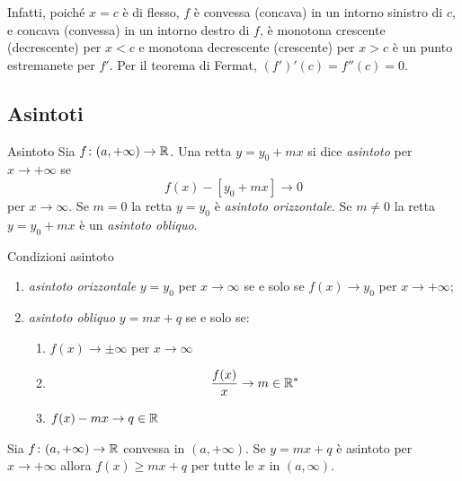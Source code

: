 \documentclass[a4paper]{article}
\begin{document}
Infatti, poiché \(x=c\) è di flesso, \(f\) è convessa (concava) in un intorno sinistro di \(c\),
e concava (convessa) in un intorno destro di \(f\), è monotona crescente (decrescente)
per \(x<c\) e monotona decrescente (crescente) per \(x>c\) è un punto estremanete per \(f'\).
Per il teorema di Fermat, \((f')'(c) = f''(c) = 0\).

\subsection{Asintoti}

\begin{radioactive}
\begin{snippetdefinition}{Asintoto}
    Sia \(f\colon (a, +\infty) \to \mathbb{R}\).
    Una retta \(y = y_0 + mx\) si dice \emph{asintoto}
    per \(x\to+\infty\) se
    \[
        f(x) - [y_0 + mx] \to 0
    \]
    per \(x \to \infty\).
    Se \(m=0\) la retta \(y=y_0\) è \emph{asintoto orizzontale}.
    Se \(m\neq 0\) la retta \(y = y_0 + mx\) è un \emph{asintoto obliquo}.
\end{snippetdefinition}

\begin{snippetproposition}{Condizioni asintoto}
    \begin{enumerate}
        \item \emph{asintoto orizzontale} \(y=y_0\) per \(x\to \infty\) se e solo se \(f(x) \to y_0\) per \(x \to +\infty\);
        \item \emph{asintoto obliquo} \(y = mx + q\) se e solo se:
        \begin{enumerate}
            \item \(f(x) \to \pm \infty\) per \(x\to\infty\)
            \item \[
                \frac{f(x)}{x} \to m \in \mathbb{R}^*
            \]
            \item \(f(x) - mx \to q \in \mathbb{R}\)
        \end{enumerate}
    \end{enumerate}
\end{snippetproposition}

\begin{snippettheorem}{}
    Sia \(f\colon (a, +\infty) \to \mathbb{R}\) convessa in \((a, +\infty)\).
    Se \(y = mx + q\) è asintoto per \(x \to +\infty\) allora
    \(f(x) \geq mx + q\) per tutte le \(x\) in \((a, \infty)\).
\end{snippettheorem}
\end{radioactive}
\end{document}

